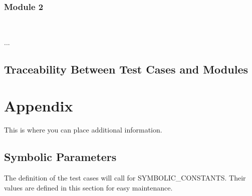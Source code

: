 \documentclass[12pt, titlepage]{article}
\begin{document}
\subsubsection{Module 2}
\

...


\subsection{Traceability Between Test Cases and Modules}


				




\newpage

\section{Appendix}

This is where you can place additional information.

\subsection{Symbolic Parameters}

The definition of the test cases will call for SYMBOLIC\_CONSTANTS.
Their values are defined in this section for easy maintenance.
\end{document}
